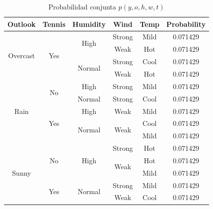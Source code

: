 \documentclass[11pt]{article}
\begin{document}
\begin{table}[h]
\centering
\begin{tabular}{c|c|c|c|c||c}
\textbf{Outlook}                   & \textbf{Tennis}               & \textbf{Humidity}                & \textbf{Wind}                  & \textbf{Temp} & \textbf{Probability} \\ \hline \hline
\multirow{4}{*}{Overcast} & \multirow{4}{*}{Yes} & \multirow{2}{*}{High}   & Strong                & Mild & 0.071429    \\ \cline{4-6} 
                          &                      &                         & Weak                  & Hot  & 0.071429    \\ \cline{3-6} 
                          &                      & \multirow{2}{*}{Normal} & Strong                & Cool & 0.071429    \\ \cline{4-6} 
                          &                      &                         & Weak                  & Hot  & 0.071429    \\ \hline
\multirow{5}{*}{Rain}     & \multirow{2}{*}{No}  & High                    & Strong                & Mild & 0.071429    \\ \cline{3-6} 
                          &                      & Normal                  & Strong                & Cool & 0.071429    \\ \cline{2-6} 
                          & \multirow{3}{*}{Yes} & High                    & Weak                  & Mild & 0.071429    \\ \cline{3-6} 
                          &                      & \multirow{2}{*}{Normal} & \multirow{2}{*}{Weak} & Cool & 0.071429    \\ \cline{5-6} 
                          &                      &                         &                       & Mild & 0.071429    \\ \hline
\multirow{5}{*}{Sunny}    & \multirow{3}{*}{No}  & \multirow{3}{*}{High}   & Strong                & Hot  & 0.071429    \\ \cline{4-6} 
                          &                      &                         & \multirow{2}{*}{Weak} & Hot  & 0.071429    \\ \cline{5-6} 
                          &                      &                         &                       & Mild & 0.071429    \\ \cline{2-6} 
                          & \multirow{2}{*}{Yes} & \multirow{2}{*}{Normal} & Strong                & Mild & 0.071429    \\ \cline{4-6} 
                          &                      &                         & Weak                  & Cool & 0.071429   

    \end{tabular}
    \caption{Probabilidad conjunta $p(y,o,h,w,t)$}
    \label{tab:joint_proba_yohwt}
\end{table}
\end{document}

